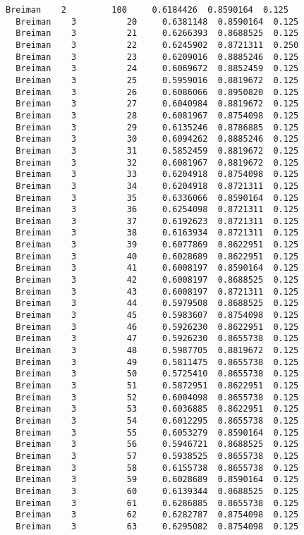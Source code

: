 \documentclass[11pt]{article}
\begin{document}
\begin{Verbatim}[commandchars=\\\{\}]
  Breiman    2         100     0.6184426  0.8590164  0.125
  Breiman    3          20     0.6381148  0.8590164  0.125
  Breiman    3          21     0.6266393  0.8688525  0.125
  Breiman    3          22     0.6245902  0.8721311  0.250
  Breiman    3          23     0.6209016  0.8885246  0.125
  Breiman    3          24     0.6069672  0.8852459  0.125
  Breiman    3          25     0.5959016  0.8819672  0.125
  Breiman    3          26     0.6086066  0.8950820  0.125
  Breiman    3          27     0.6040984  0.8819672  0.125
  Breiman    3          28     0.6081967  0.8754098  0.125
  Breiman    3          29     0.6135246  0.8786885  0.125
  Breiman    3          30     0.6094262  0.8885246  0.125
  Breiman    3          31     0.5852459  0.8819672  0.125
  Breiman    3          32     0.6081967  0.8819672  0.125
  Breiman    3          33     0.6204918  0.8754098  0.125
  Breiman    3          34     0.6204918  0.8721311  0.125
  Breiman    3          35     0.6336066  0.8590164  0.125
  Breiman    3          36     0.6254098  0.8721311  0.125
  Breiman    3          37     0.6192623  0.8721311  0.125
  Breiman    3          38     0.6163934  0.8721311  0.125
  Breiman    3          39     0.6077869  0.8622951  0.125
  Breiman    3          40     0.6028689  0.8622951  0.125
  Breiman    3          41     0.6008197  0.8590164  0.125
  Breiman    3          42     0.6008197  0.8688525  0.125
  Breiman    3          43     0.6008197  0.8721311  0.125
  Breiman    3          44     0.5979508  0.8688525  0.125
  Breiman    3          45     0.5983607  0.8754098  0.125
  Breiman    3          46     0.5926230  0.8622951  0.125
  Breiman    3          47     0.5926230  0.8655738  0.125
  Breiman    3          48     0.5987705  0.8819672  0.125
  Breiman    3          49     0.5811475  0.8655738  0.125
  Breiman    3          50     0.5725410  0.8655738  0.125
  Breiman    3          51     0.5872951  0.8622951  0.125
  Breiman    3          52     0.6004098  0.8655738  0.125
  Breiman    3          53     0.6036885  0.8622951  0.125
  Breiman    3          54     0.6012295  0.8655738  0.125
  Breiman    3          55     0.6053279  0.8590164  0.125
  Breiman    3          56     0.5946721  0.8688525  0.125
  Breiman    3          57     0.5938525  0.8655738  0.125
  Breiman    3          58     0.6155738  0.8655738  0.125
  Breiman    3          59     0.6028689  0.8590164  0.125
  Breiman    3          60     0.6139344  0.8688525  0.125
  Breiman    3          61     0.6286885  0.8655738  0.125
  Breiman    3          62     0.6282787  0.8754098  0.125
  Breiman    3          63     0.6295082  0.8754098  0.125

\end{Verbatim}
\end{document}
